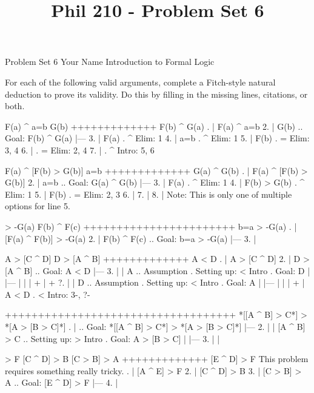 
\title{Phil 210 - Problem Set 6}

\heading
Problem Set 6
Your Name
Introduction to Formal Logic
\endheading

For each of the following valid arguments, complete a Fitch-style natural deduction to prove its validity. Do this by filling in the missing lines, citations, or both.

\problems
{}
\argument
 F(a) ^ a=b
 G(b)
+++++++++++++
 F(b) ^ G(a)
\endargument
        \answer
        . | F(a) ^ a=b
         2. | G(b)         ..  Goal: F(b) ^ G(a)
            |---
         3. | F(a)         .  ^ Elim: 1
         4. | a=b          .  ^ Elim: 1
         5. | F(b)         .  = Elim: 3, 4
         6. |              .  = Elim: 2, 4
         7. |              .  ^ Intro: 5, 6
        \endfitchproof
        \endanswer

\argument
 F(a) ^ [F(b) > G(b)]
 a=b
+++++++++++++
 G(a) ^ G(b)
\endargument
        \answer
        . | F(a) ^ [F(b) > G(b)]
         2. | a=b          ..  Goal: G(a) ^ G(b)
            |---
         3. | F(a)         .  ^ Elim: 1
         4. | F(b) > G(b)  .  ^ Elim: 1
         5. | F(b)         .  = Elim: 2, 3
         6. | 
         7. | 
         8. | 
        \endfitchproof
        \endanswer
Note: This is only one of multiple options for line 5.

\argument
 [F(a) ^ F(b)] > -G(a)
 F(b) ^ F(c)
+++++++++++++++++++++++
 b=a > -G(a)
\endargument
        \answer
        . | [F(a) ^ F(b)] > -G(a)
         2. | F(b) ^ F(c)    ..  Goal: b=a > -G(a)
            |---
         3. | 
        \endfitchproof
        \endanswer

\argument
 A > [C ^ D]
 D > [A ^ B]
+++++++++++++
 A < D
\endargument
        \answer
        . | A > [C ^ D]
         2. | D > [A ^ B]  ..  Goal: A < D
            |---
         3. |   | A        ..  Assumption  .  Setting up: < Intro  .  Goal: D
            |   |---
            |   | 
            |   +
            |   +
         ?. |   | D        ..  Assumption  .  Setting up: < Intro  .  Goal: A
            |   |---
            |   | 
            |   +
            | A < D        .  < Intro: 3-, ?-
        \endfitchproof
        \endanswer

\argument

+++++++++++++++++++++++++++++++++++
 *[[A ^ B] > C*] > *[A > [B > C]*]
\endargument
        \answer
        . |                    ..  Goal: *[[A ^ B] > C*] > *[A > [B > C]*]
            |---
         2. |   | [A ^ B] > C    ..  Setting up: > Intro  .  Goal: A > [B > C]
            |   |---
         3. |   | 
        \endfitchproof
        \endanswer

\argument
 [A ^ E] > F
 [C ^ D] > B
 [C > B] > A
+++++++++++++
 [E ^ D] > F
\endargument
\Hint This problem requires something really tricky.
        \answer
        . | [A ^ E] > F
         2. | [C ^ D] > B
         3. | [C > B] > A  ..  Goal: [E ^ D] > F
            |---
         4. | 
        \endfitchproof
        \endanswer

\endproblems
\bye
